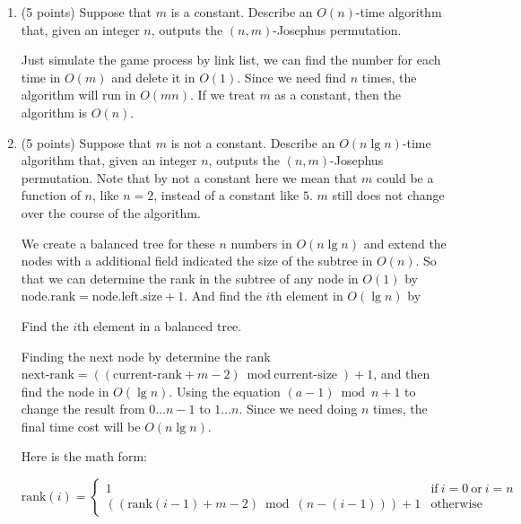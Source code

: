 \documentclass[paper=a4, fontsize=11pt]{scrartcl} %
\begin{document}
\begin{enumerate}
\item
  \begin{fancyquotes}
    (5 points) Suppose that $m$ is a constant. Describe an $O(n)$-time
    algorithm that, given an integer $n$, outputs the $(n,m)$-Josephus
    permutation.
  \end{fancyquotes}

  Just simulate the game process by link list, we can find the number
  for each time in $O(m)$ and delete it in $O(1)$. Since we need find
  $n$ times, the algorithm will run in $O(mn)$. If we treat $m$ as a
  constant, then the algorithm is $O(n)$.

\item
  \begin{fancyquotes}
    (5 points) Suppose that $m$ is not a constant. Describe an
    $O(n\lg{n})$-time algorithm that, given an integer $n$, outputs
    the $(n,m)$-Josephus permutation. Note that by not a constant
    here we mean that $m$ could be a function of $n$, like $n=2$,
    instead of a constant like $5$. $m$ still does not change over the
    course of the algorithm.
  \end{fancyquotes}

  We create a balanced tree for these $n$ numbers in $O(n\lg{n})$ and
  extend the nodes with a additional field indicated the size of the
  subtree in $O(n)$. So that we can determine the rank in the subtree
  of any node in $O(1)$ by $\text{node.rank} =
  \text{node.left.size}+1$. And find the $i$th element in $O(\lg{n})$
  by

  \begin{algorithm}[H]
    \caption{Find the $i$th element in a balanced tree.}
  \end{algorithm}

  Finding the next node by determine the rank $\text{next-rank} =
  ((\text{current-rank} + m -2) \bmod \text{current-size}) + 1$, and
  then find the node in $O(\lg{n})$. Using the equation $(a-1)\bmod n
  +1$ to change the result from $0\dots n-1$ to $1\dots n$. Since we
  need doing $n$ times, the final time cost will be $O(n\lg{n})$.

  Here is the math form:

  \begin{equation*}
    \text{rank}(i)=
    \begin{cases}
      1 & \text{if}\ i=0\ \text{or}\ i=n \\
      ((\text{rank}(i-1)+m-2) \bmod (n-(i-1))) +1 & \text{otherwise}
    \end{cases}
  \end{equation*}

\end{enumerate}


\end{document}
